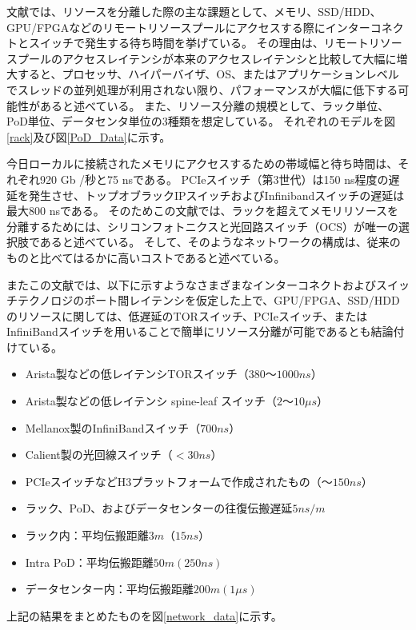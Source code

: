 \documentclass[a4j]{ujarticle}
\begin{document}
\clearpage
文献\cite{ComposableArchitectureforRackScaleBigDataComputing}では、リソースを分離した際の主な課題として、メモリ、SSD/HDD、GPU/FPGAなどのリモートリソースプールにアクセスする際にインターコネクトとスイッチで発生する待ち時間を挙げている。
その理由は、リモートリソースプールのアクセスレイテンシが本来のアクセスレイテンシと比較して大幅に増大すると、プロセッサ、ハイパーバイザ、OS、またはアプリケーションレベルでスレッドの並列処理が利用されない限り、パフォーマンスが大幅に低下する可能性があると述べている。
また、リソース分離の規模として、ラック単位、PoD単位、データセンタ単位の3種類を想定している。
それぞれのモデルを図\ref{rack}及び図\ref{PoD_Data}に示す。

今日ローカルに接続されたメモリにアクセスするための帯域幅と待ち時間は、それぞれ920 Gb /秒と75 nsである。
PCIeスイッチ（第3世代）は150 ns程度の遅延を発生させ、トップオブラックIPスイッチおよびInfinibandスイッチの遅延は最大800 nsである。
そのためこの文献では、ラックを超えてメモリリソースを分離するためには、シリコンフォトニクスと光回路スイッチ（OCS）が唯一の選択肢であると述べている\cite{TheEmergingOpticalDataCenter,ADemonstrationofUltralowlatencyDataCenterOpticalCircuitSwitching,DeliveringScaleOutDataCenterNetworkingwithOpticsWhyandHow}。
そして、そのようなネットワークの構成は、従来のものと比べてはるかに高いコストであると述べている\cite{DisaggregatedandOpticallyInterconnectedMemoryWhenwillitbecosteffective}。

またこの文献では、以下に示すようなさまざまなインターコネクトおよびスイッチテクノロジのポート間レイテンシを仮定した上で、GPU/FPGA、SSD/HDDのリソースに関しては、低遅延のTORスイッチ、PCIeスイッチ、またはInfiniBandスイッチを用いることで簡単にリソース分離が可能であるとも結論付けている。
\begin{itemize}
  \item Arista製などの低レイテンシTORスイッチ$（380〜1000 ns）$\cite{AristaNetworksCloudNetworkingPortfolio}
  \item Arista製などの低レイテンシ spine-leaf スイッチ$（2〜10\mu s）$\cite{AristaNetworksCloudNetworkingPortfolio}
  \item Mellanox製のInfiniBandスイッチ$（700 ns）$
  \item Calient製の光回線スイッチ$（< 30 ns）$\cite{CalientS320Datasheet}
  \item PCIeスイッチなどH3プラットフォームで作成されたもの$（〜150 ns）$
  \item ラック、PoD、およびデータセンターの往復伝搬遅延$5 ns/m$
  \item ラック内：平均伝搬距離$3m（15ns）$
  \item Intra PoD：平均伝搬距離$50m (250ns)$
  \item データセンター内：平均伝搬距離$200m (1\mu s)$
\end{itemize}
上記の結果をまとめたものを図\ref{network_data}に示す。
\end{document}
